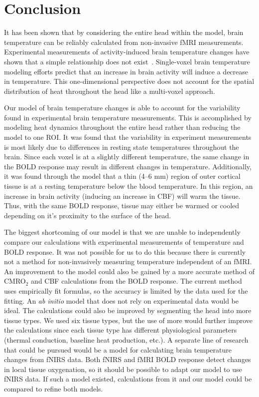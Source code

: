 \chapter{Conclusion}

It has been shown that by considering the entire head within the model, brain temperature can be reliably calculated from non-invasive fMRI measurements. Experimental measurements of activity-induced brain temperature changes have shown that a simple relationship does not exist~\citep{mcelligott,kiyatkin,zeschke,george,tachibana}. Single-voxel brain temperature modeling efforts predict that an increase in brain activity will induce a decrease in temperature. This one-dimensional perspective does not account for the spatial distribution of heat throughout the head like a multi-voxel approach.

Our model of brain temperature changes is able to account for the variability found in experimental brain temperature measurements.  This is accomplished by modeling heat dynamics throughout the entire head rather than reducing the model to one ROI.  It was found that the variability in experiment measurements is most likely due to differences in resting state temperatures throughout the brain.  Since each voxel is at a slightly different temperature, the same change in the BOLD response may result in different changes in temperature. Additionally, it was found through the model that a thin (4--6 mm) region of outer cortical tissue is at a resting temperature below the blood temperature.  In this region, an increase in brain activity (inducing an increase in CBF) will warm the tissue.  Thus, with the same BOLD response, tissue may either be warmed or cooled depending on it's proximity to the surface of the head.

The biggest shortcoming of our model is that we are unable to independently compare our calculations with experimental measurements of temperature and BOLD response. It was not possible for us to do this because there is currently not a method for non-invasively measuring temperature independent of an fMRI. An improvement to the model could also be gained by a more accurate method of CMRO$_2$ and CBF calculations from the BOLD response. The current method uses empirically fit formulas, so the accuracy is limited by the data used for the fitting. An \textit{ab initio} model that does not rely on experimental data would be ideal. The calculations could also be improved by segmenting the head into more tissue types.  We used six tissue types, but the use of more would further improve the calculations since each tissue type has different physiological parameters (thermal conduction, baseline heat production, etc.). A separate line of research that could be pursued would be a model for calculating brain temperature changes from fNIRS data. Both fNIRS and fMRI BOLD response detect changes in local tissue oxygenation, so it should be possible to adapt our model to use fNIRS data. If such a model existed, calculations from it and our model could be compared to refine both models.

